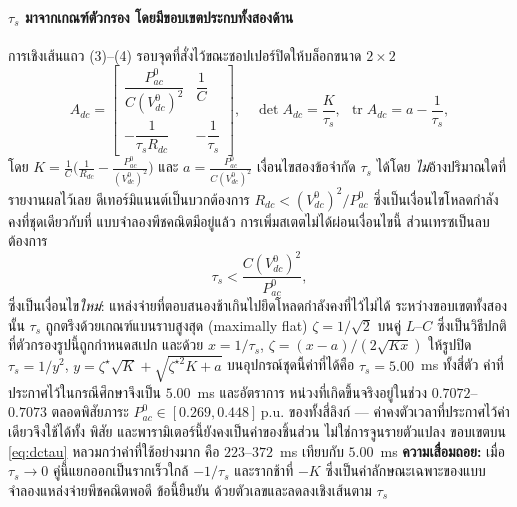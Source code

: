\documentclass[12pt,a4paper]{article}
\newcommand{\pu}{\,\mathrm{p.u.}}
\begin{document}
\paragraph{$\tau_s$ มาจากเกณฑ์ตัวกรอง โดยมีขอบเขตประกบทั้งสองด้าน}
การเชิงเส้นแถว (3)--(4) รอบจุดที่สั่งไว้ขณะชอปเปอร์ปิดให้บล็อกขนาด $2\times2$
\begin{equation}
  A_{dc}=\begin{bmatrix}
    \dfrac{P_{ac}^{0}}{C(V_{dc}^{0})^{2}} & \dfrac1C\\[8pt]
    -\dfrac{1}{\tau_sR_{dc}} & -\dfrac1{\tau_s}\end{bmatrix},
  \quad
  \det A_{dc}=\frac{K}{\tau_s},\ \ \operatorname{tr}A_{dc}=a-\frac1{\tau_s},
  \label{eq:dcblock}
\end{equation}
โดย $K=\frac1C\bigl(\frac1{R_{dc}}-\frac{P_{ac}^{0}}{(V_{dc}^{0})^{2}}\bigr)$ และ
$a=\frac{P_{ac}^{0}}{C(V_{dc}^{0})^{2}}$ เงื่อนไขสองข้อจำกัด $\tau_s$ ได้โดย
\emph{ไม่}อ้างปริมาณใดที่รายงานผลไว้เลย ดีเทอร์มิแนนต์เป็นบวกต้องการ
$R_{dc}<(V_{dc}^{0})^{2}/P_{ac}^{0}$ ซึ่งเป็นเงื่อนไขโหลดกำลังคงที่ชุดเดียวกับที่
แบบจำลองพีชคณิตมีอยู่แล้ว การเพิ่มสเตตไม่ได้ผ่อนเงื่อนไขนี้ ส่วนเทรซเป็นลบต้องการ
\begin{equation}
  \tau_s<\frac{C(V_{dc}^{0})^{2}}{P_{ac}^{0}},
  \label{eq:dctau}
\end{equation}
ซึ่งเป็นเงื่อนไข\emph{ใหม่}: แหล่งจ่ายที่ตอบสนองช้าเกินไปยึดโหลดกำลังคงที่ไว้ไม่ได้
ระหว่างขอบเขตทั้งสองนั้น $\tau_s$ ถูกตรึงด้วยเกณฑ์แบนราบสูงสุด (maximally flat)
$\zeta=1/\sqrt2$ บนคู่ $L$--$C$ ซึ่งเป็นวิธีปกติที่ตัวกรองรูปนี้ถูกกำหนดสเปก และด้วย
$x=1/\tau_s$, $\zeta=(x-a)/(2\sqrt{Kx})$ ให้รูปปิด $\tau_s=1/y^2$,
$y=\zeta^{\star}\sqrt K+\sqrt{\zeta^{\star2}K+a}$ บนอุปกรณ์ชุดนี้ค่าที่ได้คือ
$\tau_s=5.00$~ms ทั้งสี่ตัว ค่าที่ประกาศไว้ในกรณีศึกษาจึงเป็น $5.00$~ms และอัตราการ
หน่วงที่เกิดขึ้นจริงอยู่ในช่วง $0.7072$--$0.7073$ ตลอดพิสัยภาระ $P_{ac}^{0}\in
[0.269,0.448]\pu$ ของทั้งสี่ลิงก์ --- ค่าคงตัวเวลาที่ประกาศไว้ค่าเดียวจึงใช้ได้ทั้ง
พิสัย และพารามิเตอร์นี้ยังคงเป็นค่าของชิ้นส่วน ไม่ใช่การจูนรายตัวแปลง ขอบเขตบน
\eqref{eq:dctau} หลวมกว่าค่าที่ใช้อย่างมาก คือ $223$--$372$~ms เทียบกับ $5.00$~ms
\textbf{ความเสื่อมถอย:} เมื่อ $\tau_s\to0$ คู่นี้แยกออกเป็นรากเร็วใกล้ $-1/\tau_s$
และรากช้าที่ $-K$ ซึ่งเป็นค่าลักษณะเฉพาะของแบบจำลองแหล่งจ่ายพีชคณิตพอดี ข้อนี้ยืนยัน
ด้วยตัวเลขและลดลงเชิงเส้นตาม $\tau_s$
\end{document}
